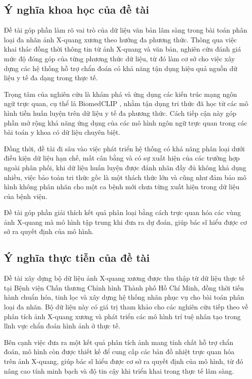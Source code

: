 \subsection{Ý nghĩa khoa học của đề tài}

Đề tài góp phần làm rõ vai trò của dữ liệu văn bản lâm sàng trong bài toán phân loại đa nhãn ảnh X-quang xương 
theo hướng đa phương thức. Thông qua việc khai thác đồng thời thông tin từ ảnh X-quang và văn bản, 
nghiên cứu đánh giá mức độ đóng góp của từng phương thức dữ liệu, từ đó làm cơ sở cho việc xây dựng các hệ thống 
hỗ trợ chẩn đoán có khả năng tận dụng hiệu quả nguồn dữ liệu y tế đa dạng trong thực tế.

Trọng tâm của nghiên cứu là khám phá và ứng dụng các kiến trúc mạng ngôn ngữ trực quan, cụ thể là BiomedCLIP \cite{BiomedCLIP}, 
nhằm tận dụng tri thức đã học từ các mô hình tiền huấn luyện trên dữ liệu y tế đa phương thức. 
Cách tiếp cận này góp phần mở rộng khả năng ứng dụng của các mô hình ngôn ngữ trực quan 
trong các bài toán y khoa có dữ liệu chuyên biệt.

Đồng thời, đề tài đi sâu vào việc phát triển hệ thống có khả năng phân loại dưới điều kiện dữ liệu hạn chế, 
mất cân bằng và có sự xuất hiện của các trường hợp ngoài phân phối, 
khi dữ liệu huấn luyện được đánh nhãn đầy đủ không khả dụng nhiều, việc bảo toàn tri thức gốc là một thách thức lớn 
và cũng như đảm bảo mô hình không phân nhãn cho một ca bệnh mới chưa từng xuất hiện trong dữ liệu của bệnh viện.

Đề tài góp phần giải thích kết quả phân loại bằng cách trực quan hóa các vùng ảnh X-quang mà mô hình tập trung khi đưa ra dự đoán, 
giúp bác sĩ hiểu được cơ sở ra quyết định của mô hình.

\subsection{Ý nghĩa thực tiễn của đề tài}

Đề tài xây dựng bộ dữ liệu ảnh X-quang xương được thu thập từ dữ liệu thực tế tại Bệnh viện Chấn thương 
Chỉnh hình Thành phố Hồ Chí Minh, đồng thời tiến hành chuẩn hóa, tinh lọc và xây dựng hệ thống nhãn phục vụ 
cho bài toán phân loại đa nhãn. Bộ dữ liệu này có giá trị tham khảo cho các nghiên cứu tiếp theo về phân tích 
ảnh X-quang xương và phát triển các mô hình trí tuệ nhân tạo trong lĩnh vực chẩn đoán hình ảnh ở thực tế.

Bên cạnh việc đưa ra một kết quả phân tích ảnh mang tính chất hỗ trợ chẩn đoán, 
mô hình còn được thiết kế để cung cấp các bản đồ nhiệt trực quan hóa trên ảnh X-quang, 
giúp bác sĩ hiểu được cơ sở ra quyết định của mô hình, 
từ đó nâng cao tính minh bạch và độ tin cậy khi triển khai trong thực tế lâm sàng.

